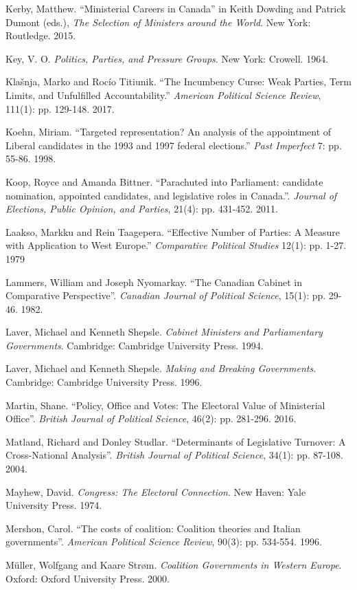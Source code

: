 \documentclass[letter,12pt]{article}
\begin{document}
\begin{hangparas}{.25in}{1}
Kerby, Matthew. ``Ministerial Careers in Canada'' in Keith Dowding and Patrick Dumont (eds.), \textit{The Selection of Ministers around the World}. New York: Routledge. 2015.

Key, V. O. \textit{Politics, Parties, and Pressure Groups}. New York: Crowell. 1964.

Kla\v{s}nja, Marko and Roc\'{i}o Titiunik. ``The Incumbency Curse: Weak Parties, Term Limits, and Unfulfilled Accountability.'' \textit{American Political Science Review}, 111(1): pp. 129-148. 2017.

Koehn, Miriam. ``Targeted representation? An analysis of the appointment of Liberal candidates in the 1993 and 1997 federal elections.'' \textit{Past Imperfect} 7: pp. 55-86. 1998.

Koop, Royce and Amanda Bittner. ``Parachuted into Parliament: candidate nomination, appointed candidates, and legislative roles in Canada.''. \textit{Journal of Elections, Public Opinion, and Parties}, 21(4): pp. 431-452. 2011.

Laakso, Markku and Rein Taagepera. ``Effective Number of Parties: A Measure with Application to West Europe.'' \textit{Comparative Political Studies} 12(1): pp. 1-27. 1979

Lammers, William and Joseph Nyomarkay. ``The Canadian Cabinet in Comparative Perspective''. \textit{Canadian Journal of Political Science}, 15(1): pp. 29-46. 1982.

Laver, Michael and Kenneth Shepsle. \textit{Cabinet Ministers and Parliamentary Governments}. Cambridge: Cambridge University Press. 1994.

Laver, Michael and Kenneth Shepsle. \textit{Making and Breaking Governments}. Cambridge: Cambridge University Press. 1996.

Martin, Shane. ``Policy, Office and Votes: The Electoral Value of Ministerial Office''. \textit{British Journal of Political Science}, 46(2): pp. 281-296. 2016.

Matland, Richard and Donley Studlar. ``Determinants of Legislative Turnover: A Cross-National Analysis''. \textit{British Journal of Political Science}, 34(1): pp. 87-108. 2004.

Mayhew, David. \textit{Congress: The Electoral Connection}. New Haven: Yale University Press. 1974.

Mershon, Carol. ``The costs of coalition: Coalition theories and Italian governments''. \textit{American Political Science Review}, 90(3): pp. 534-554. 1996.

M{\"u}ller, Wolfgang and Kaare Str{\o}m. \textit{Coalition Governments in Western Europe}. Oxford: Oxford University Press. 2000.


\end{hangparas}
\end{document}
